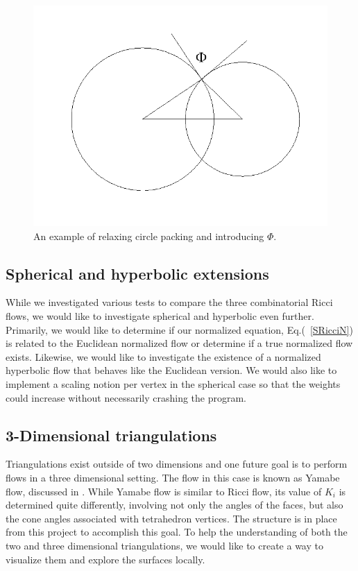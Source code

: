 \documentclass[12pt]{article}
\begin{document}
\begin{figure}
\begin{center}
\includegraphics[scale = 0.6]{Pictures3/intcirc2.png}
\end{center}
\caption{An example of relaxing circle packing and introducing $\Phi.$}
\label{fig:intcirc}
\end{figure}

\subsection{Spherical and hyperbolic extensions}
While we investigated various tests to compare the three combinatorial Ricci flows, we would like to investigate spherical and hyperbolic even further. Primarily, we would like to determine if our normalized equation, Eq.(~\ref{SRicciN}) is related to the Euclidean normalized flow or determine if a true normalized flow exists. Likewise, we would like to investigate the existence of a normalized hyperbolic flow that behaves like the Euclidean version. We would also like to implement a scaling notion per vertex in the spherical case so that the weights could increase without necessarily crashing the program. 

\subsection{3-Dimensional triangulations}
Triangulations exist outside of two dimensions and one future goal is to perform flows in a three dimensional setting. The flow in this case is known as Yamabe flow, discussed in \cite{DrG}. While Yamabe flow is similar to Ricci flow, its value of $K_i$ is determined quite differently, involving not only the angles of the faces, but also the cone angles associated with tetrahedron vertices. The structure is in place from this project to accomplish this goal. To help the understanding of both the two and three dimensional triangulations, we would like to create a way to visualize them and explore the surfaces locally.
\end{document}
